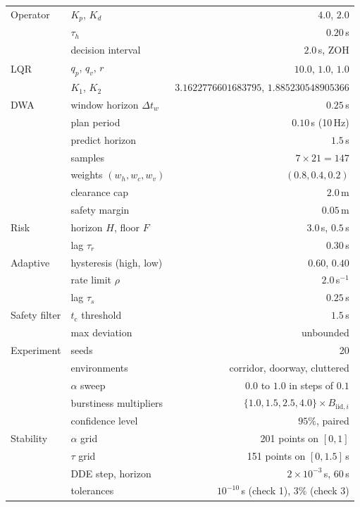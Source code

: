 \documentclass[11pt,a4paper]{article}
\newcommand{\ttc}{t_{\mathrm{c}}}
\theoremstyle{plain}
\theoremstyle{definition}
\begin{document}
\begin{longtable}{@{}llr@{}}
\midrule
Operator & $K_p$, $K_d$ & $4.0$, $2.0$ \\
         & $\tau_h$ & $0.20$\,s \\
         & decision interval & $2.0$\,s, ZOH \\
\midrule
LQR & $q_p$, $q_v$, $r$ & $10.0$, $1.0$, $1.0$ \\
    & $K_1$, $K_2$ & $3.1622776601683795$, $1.885230548905366$ \\
\midrule
DWA & window horizon $\Delta t_w$ & $0.25$\,s \\
    & plan period & $0.10$\,s (10\,Hz) \\
    & predict horizon & $1.5$\,s \\
    & samples & $7 \times 21 = 147$ \\
    & weights $(w_h, w_c, w_v)$ & $(0.8, 0.4, 0.2)$ \\
    & clearance cap & $2.0$\,m \\
    & safety margin & $0.05$\,m \\
\midrule
Risk & horizon $H$, floor $F$ & $3.0$\,s, $0.5$\,s \\
     & lag $\tau_r$ & $0.30$\,s \\
\midrule
Adaptive & hysteresis (high, low) & $0.60$, $0.40$ \\
         & rate limit $\rho$ & $2.0$\,s$^{-1}$ \\
         & lag $\tau_s$ & $0.25$\,s \\
\midrule
Safety filter & $\ttc$ threshold & $1.5$\,s \\
              & max deviation & unbounded \\
\midrule
Experiment & seeds & 20 \\
           & environments & corridor, doorway, cluttered \\
           & $\alpha$ sweep & $0.0$ to $1.0$ in steps of $0.1$ \\
           & burstiness multipliers & $\{1.0, 1.5, 2.5, 4.0\} \times B_{\mathrm{iid},i}$ \\
           & confidence level & $95\%$, paired \\
\midrule
Stability & $\alpha$ grid & 201 points on $[0,1]$ \\
          & $\tau$ grid & 151 points on $[0, 1.5]$\,s \\
          & DDE step, horizon & $2\times10^{-3}$\,s, $60$\,s \\
          & tolerances & $10^{-10}$\,s (check 1), $3\%$ (check 3) \\
\bottomrule
\end{longtable}
\end{document}
